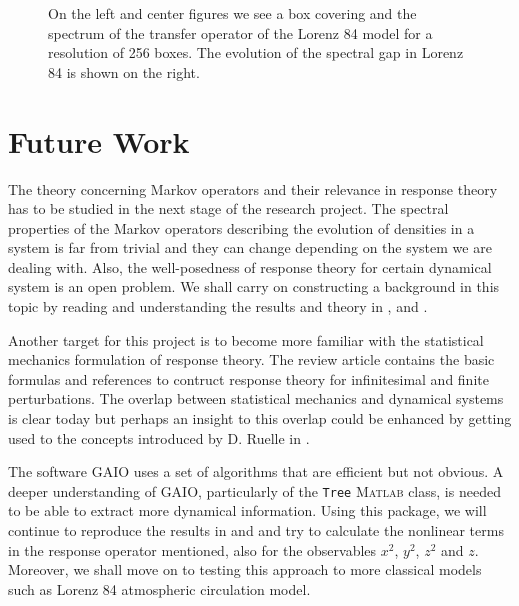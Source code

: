 \begin{figure}[H]
\begin{subfigure}[b]{0.3\textwidth}
    \end{subfigure}
	\caption{\label{unh}On the left and center figures we see a box covering and the spectrum of the transfer operator of the Lorenz 84 model for a resolution of 256 boxes. The evolution of the spectral gap in Lorenz 84 is shown on the right.}
\end{figure}

\pagebreak

\section*{Future Work}

The theory concerning Markov operators and their relevance in response theory has to be studied in the next stage of the research project. The spectral properties of the Markov operators describing the evolution of densities in a system is far from trivial and they can change depending on the system we are dealing with. Also, the well-posedness of response theory for certain dynamical system is an open problem. We shall carry on constructing a background in this topic by reading and understanding the results and theory in \cite{liverani}, \cite{hairer} and \cite{baladi}.

Another target for this project is to become more familiar with the statistical mechanics formulation of response theory. The review article \cite{review} contains the basic formulas and references to contruct response theory for infinitesimal and finite perturbations. The overlap between statistical mechanics and dynamical systems is clear today but perhaps an insight to this overlap could be enhanced by getting used to the concepts introduced by D. Ruelle in \cite{ruellee}.

The software GAIO uses a set of algorithms that are efficient but not obvious. A deeper understanding of GAIO, particularly of the \texttt{Tree} \textsc{Matlab}\xspace class, is needed to be able to extract more dynamical information. Using this package, we will continue to reproduce the results in \cite{lucarini} and \cite{tantet} and try to calculate the nonlinear terms in the response operator mentioned, also for the observables $x^2$, $y^2$, $z^2$ and $z$. Moreover, we shall move on to testing this approach to more classical models such as Lorenz 84 atmospheric circulation model.

